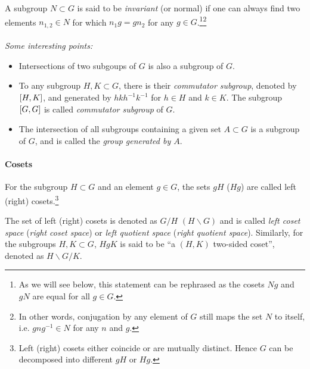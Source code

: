 A subgroup $N\subset G$ is said to be \emph{invariant} (or normal) if one can always find two elements $n_{1,2}\in N$ for which $n_1g=gn_2$ for any  $g\in G$.\footnote{As we will see below, this statement can be rephrased as the cosets $Ng$ and $gN$ are equal for all $g\in G$.}\footnote{In other words, conjugation by any element of $G$ still maps the set $N$ to itself, i.e. $gng^{-1}\in N$ for any $n$ and $g$.}
\\\\
\emph{Some interesting points:}
\begin{itemize}
	\item Intersections of two subgoups of $G$ is also a subgroup of $G$.
	\item To any subgroup $H,K\subset G$, there is their \emph{commutator subgroup}, denoted by $\comm{H}{K}$, and generated by $hkh^{-1}k^{-1}$ for $h\in H$ and $k\in K$. The subgroup $\comm{G}{G}$ is called \emph{commutator subgroup} of $G$.
	\item The intersection of all subgroups containing a given set $A\subset G$ is a subgroup of $G$, and is called the \emph{group generated by $A$}.
\end{itemize}
\paragraph{Cosets}
For the subgroup $H\subset G$ and an element $g\in G$, the sets $g H$ ($Hg$) are called left (right) cosets.\footnote{Left (right) cosets either coincide or are mutually distinct. Hence $G$ can be decomposed into different $gH$ or $Hg$.}

The set of left (right) cosets is denoted as $G/H$ $(H\backslash G)$ and is called \emph{left coset space} (\emph{right coset space}) or \emph{left quotient space} (\emph{right quotient space}). Similarly, for the subgroups $H,K\subset G$, $HgK$ is said to be ``a $(H,K)$ two-sided coset'', denoted as $H\backslash G/K$.
